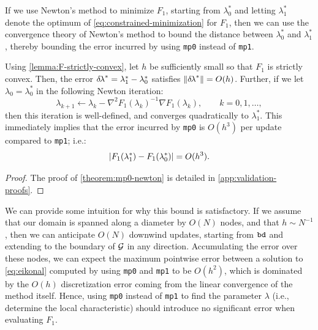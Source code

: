 \documentclass{article}
\begin{document}
If we use Newton's method to minimize $F_1$, starting from
$\lambda_0^*$ and letting $\lambda_1^*$ denote the optimum of
\cref{eq:constrained-minimization} for $F_1$, then we can use the
convergence theory of Newton's method to bound the distance between
$\lambda_0^*$ and $\lambda_1^*$, thereby bounding the error incurred
by using \texttt{mp0} instead of \texttt{mp1}.

\begin{theorem}\label{theorem:mp0-newton}
  Using \cref{lemma:F-strictly-convex}, let $h$ be sufficiently small
  so that $F_1$ is strictly convex. Then, the error
  ${\delta \hspace{-0.1em} \lambda}^* = \lambda_1^* - \lambda_0^*$ satisfies
  $\left\|{\delta \hspace{-0.1em} \lambda}^*\right\| = O(h)$. Further, if we let
  $\lambda_0 = \lambda_0^*$ in the following Newton iteration:
  \begin{equation}
    \label{eq:lam0-iter-to-lam1}
    \lambda_{k+1} \gets \lambda_k - \nabla^2 F_1(\lambda_k)^{-1} \nabla F_1(\lambda_k), \qquad k = 0, 1, \hdots,
  \end{equation}
  then this iteration is well-defined, and converges quadratically to
  $\lambda_1^*$. This immediately implies that the error incurred by
  \texttt{mp0} is $O(h^3)$ per update compared to \texttt{mp1}; i.e.:
  \begin{equation}
    \label{eq:mp0-error}
    \left|F_1(\lambda_1^*) - F_1(\lambda_0^*)\right| = O(h^3).
  \end{equation}
\end{theorem}

\begin{proof}
  The proof of \cref{theorem:mp0-newton} is detailed in
  \cref{app:validation-proofs}.
\end{proof}

We can provide some intuition for why this bound is satisfactory. If
we assume that our domain is spanned along a diameter by $O(N)$ nodes,
and that $h \sim N^{-1}$, then we can anticipate $O(N)$ downwind
updates, starting from $\texttt{bd}$ and extending to the boundary of
$\mathcal{G}$ in any direction. Accumulating the error over these nodes, we
can expect the maximum pointwise error between a solution to
\cref{eq:eikonal} computed by using \texttt{mp0} and \texttt{mp1} to
be $O(h^2)$, which is dominated by the $O(h)$ discretization error
coming from the linear convergence of the method itself. Hence, using
\texttt{mp0} instead of \texttt{mp1} to find the parameter $\lambda$
(i.e., determine the local characteristic) should introduce no
significant error when evaluating $F_1$.
\end{document}
